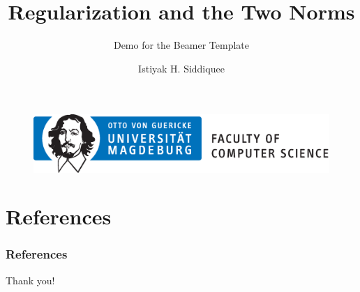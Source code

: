 \documentclass{beamer}
\author[\copyright~Istiyak H. Siddiquee]{Istiyak H. Siddiquee}
\title[Regularization \& Norms]{Regularization and the Two Norms}
\subtitle{Demo for the Beamer Template}
\institute[FIN, OvGU, Magdeburg.]{Faculty of Computer Science, \\Otto-von-Guericke University, Magdeburg.}
\date{}
\begin{document}
\begin{frame}
    \titlepage
    \vspace{-15pt}
    
    \begin{figure}
        \begin{center}
            \hspace{5pt}
            \includegraphics[width=0.6\linewidth]{inf-ovgu-logo.eps}
        \end{center}
    \end{figure}
\end{frame}

\begin{frame}
    \tableofcontents[sectionstyle=show,subsectionstyle=show/hide,subsubsectionstyle=show/hide]
\end{frame}






\section{References}
\begin{frame}[allowframebreaks]
        \frametitle{References}
        \printbibliography

\end{frame}


\begin{frame}
    \begin{center}
        {\Huge Thank you!}
    \end{center}
\end{frame}
\end{document}
